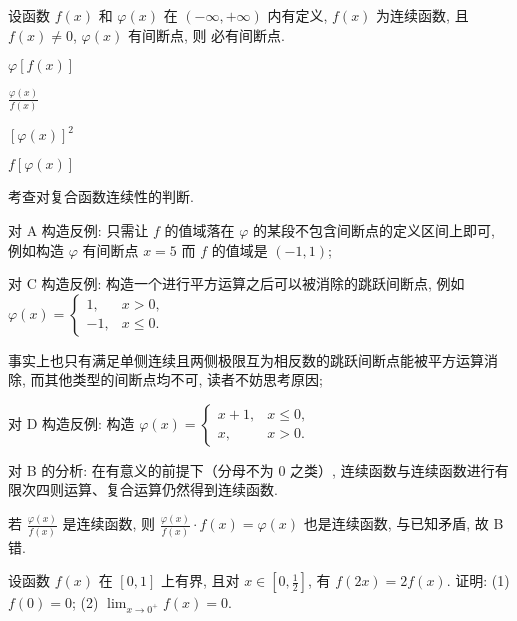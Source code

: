 \begin{question}
  设函数 $f(x)$ 和 $\varphi (x)$ 在 $\left( -\infty , +\infty \right)$ 内有定义, $f(x)$ 为连续函数,
  且 $f(x)\ne 0$, $\varphi (x)$ 有间断点,
  则 \fillin[] 必有间断点.
  \paren[B]
  \begin{choices}
    \item $\varphi \left[f(x) \right]$
    \item $\frac{\varphi (x)}{f(x)}$
    \item ${{\left[ \varphi (x) \right]}^2}$
    \item  $f\left[\varphi (x) \right]$
  \end{choices}
\end{question}

\begin{analysis}
  考查对复合函数连续性的判断.

  对 A 构造反例: 只需让 $f$ 的值域落在 $\varphi $ 的某段不包含间断点的定义区间上即可,
  例如构造 $\varphi $ 有间断点 $x=5$ 而 $f$ 的值域是 $(-1, 1)$;

  对 C 构造反例: 构造一个进行平方运算之后可以被消除的跳跃间断点,
  例如 $\varphi (x)=\begin{cases}
      1,  & x>0,      \\
      -1, & x \le 0.
    \end{cases}$

  事实上也只有满足单侧连续且两侧极限互为相反数的跳跃间断点能被平方运算消除,
  而其他类型的间断点均不可,
  读者不妨思考原因;

  对 D 构造反例: 构造 $\varphi (x)=\begin{cases}
      x+1, & x \le 0, \\
      x,   & x>0.
    \end{cases}$

  对 B 的分析: 在有意义的前提下（分母不为 $0$ 之类）,
  连续函数与连续函数进行有限次四则运算、复合运算仍然得到连续函数.

  若 $\frac{\varphi (x)}{f(x)}$ 是连续函数,
  则 $\frac{\varphi (x)}{f(x)}\cdot f(x)=\varphi (x)$ 也是连续函数,
  与已知矛盾,
  故 B 错.
\end{analysis}

\begin{question}
  设函数 $f(x) $ 在 $\left[ 0,1 \right] $ 上有界,
  且对 $x\in \left[0,\frac{1}{2} \right] $,
  有 $f(2x) = 2f(x) $.
  证明:
  (1)  $f(0) = 0$;
  (2)  $\lim_{x \to 0^+} f(x) = 0$.
\end{question}

